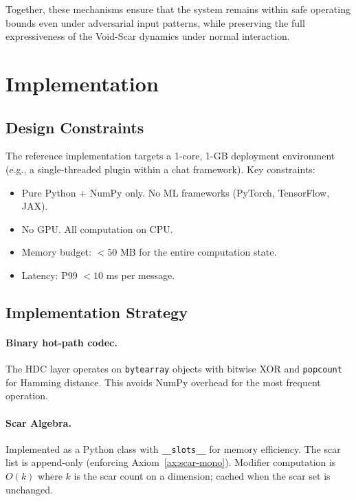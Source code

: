\documentclass[11pt]{article}
\begin{document}
Together, these mechanisms ensure that the system remains within safe operating bounds even under adversarial input patterns, while preserving the full expressiveness of the Void-Scar dynamics under normal interaction.

\section{Implementation}
\label{sec:impl}

\subsection{Design Constraints}

The reference implementation targets a 1-core, 1-GB deployment environment (e.g., a single-threaded plugin within a chat framework). Key constraints:
\begin{itemize}
\item Pure Python + NumPy only. No ML frameworks (PyTorch, TensorFlow, JAX).
\item No GPU. All computation on CPU.
\item Memory budget: $< 50$ MB for the entire computation state.
\item Latency: P99 $< 10$ ms per message.
\end{itemize}

\subsection{Implementation Strategy}

\paragraph{Binary hot-path codec.} The HDC layer operates on \texttt{bytearray} objects with bitwise XOR and \texttt{popcount} for Hamming distance. This avoids NumPy overhead for the most frequent operation.

\paragraph{Scar Algebra.} Implemented as a Python class with \texttt{\_\_slots\_\_} for memory efficiency. The scar list is append-only (enforcing Axiom~\ref{ax:scar-mono}). Modifier computation is $O(k)$ where $k$ is the scar count on a dimension; cached when the scar set is unchanged.
\end{document}
